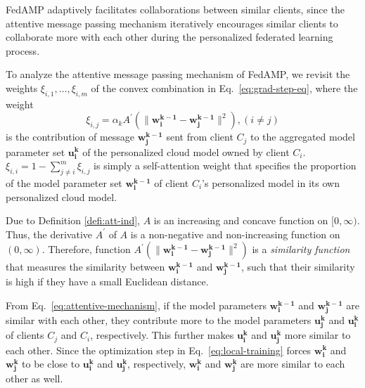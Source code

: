 \nop{===============}

FedAMP adaptively facilitates collaborations between similar clients, since the attentive message passing mechanism iteratively encourages similar clients to collaborate more with each other during the personalized federated learning process.



To analyze the attentive message passing mechanism of FedAMP, 
we revisit the weights $\xi_{i,1}, \ldots, \xi_{i,m}$ of the convex combination in Eq.~\eqref{eq:grad-step-eq}, where the weight
\begin{equation}
\label{eq:attentive-mechanism}
    \xi_{i,j}=\alpha_k A^\prime\left(\|\mathbf{w_i^{k-1}} - \mathbf{w_j^{k-1}}\|^2\right), (i\neq j)
\end{equation}
is the contribution of message $\mathbf{w_j^{k-1}}$ sent from client $C_j$ to the aggregated model parameter set $\mathbf{u_i^{k}}$ of the personalized cloud model owned by client $C_i$.
$\xi_{i,i} = 1 - \sum_{j\neq i}^m \xi_{i,j}$
is simply a self-attention weight that specifies the proportion of the model parameter set $\mathbf{w_i^{k-1}}$ of client $C_i$'s personalized model in its own personalized cloud model.

Due to Definition \ref{defi:att-ind}, $A$ is an increasing and concave function on $[0,\infty)$. Thus, the derivative $A^\prime$ of $A$ is a non-negative and non-increasing function on $(0,\infty)$.
Therefore, function $A^\prime(\|\mathbf{w_i^{k-1}} - \mathbf{w_j^{k-1}}\|^2)$ is a \textit{similarity function} that measures the similarity between $\mathbf{w_i^{k-1}}$ and $\mathbf{w_j^{k-1}}$, such that their similarity is high if they have a small Euclidean distance.

From Eq.~\eqref{eq:attentive-mechanism},
if the model parameters $\mathbf{w_i^{k-1}}$ and $\mathbf{w_j^{k-1}}$ are similar with each other, they contribute more to the model parameters $\mathbf{u_j^k}$ and $\mathbf{u_i^k}$ of clients $C_j$ and $C_i$, respectively.
This further makes $\mathbf{u_i^k}$ and $\mathbf{u_j^k}$ more similar to each other.
Since the optimization step in Eq.~\eqref{eq:local-training} forces $\mathbf{w_i^k}$ and $\mathbf{w_j^k}$ to be close to $\mathbf{u_i^k}$ and $\mathbf{u_j^k}$, respectively, $\mathbf{w_i^k}$ and $\mathbf{w_j^k}$ are more similar to each other as well.
 
